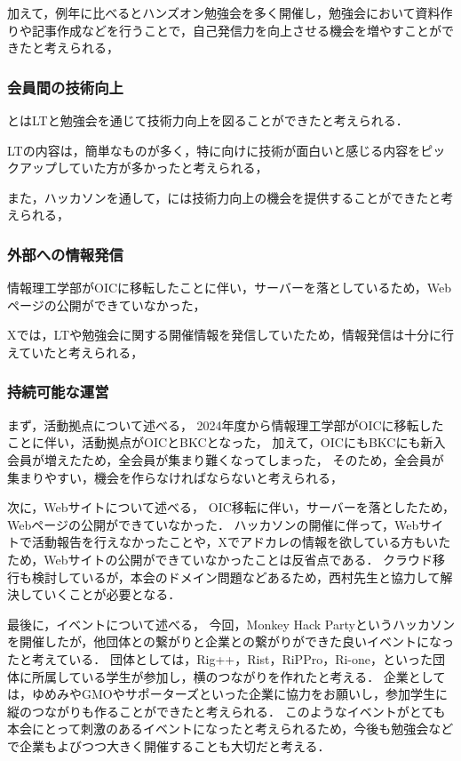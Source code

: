 加えて，例年に比べるとハンズオン勉強会を多く開催し，勉強会において資料作りや記事作成などを行うことで，自己発信力を向上させる機会を増やすことができたと考えられる，

\subsubsection*{会員間の技術向上}
\secondGrade{}と\thirdGrade{}はLTと勉強会を通じて技術力向上を図ることができたと考えられる．

LTの内容は，簡単なものが多く，特に\firstGrade{}向けに技術が面白いと感じる内容をピックアップしていた方が多かったと考えられる，

また，ハッカソンを通して，\firstGrade{}には技術力向上の機会を提供することができたと考えられる，

\subsubsection*{外部への情報発信}
情報理工学部がOICに移転したことに伴い，サーバーを落としているため，Webページの公開ができていなかった，

Xでは，LTや勉強会に関する開催情報を発信していたため，情報発信は十分に行えていたと考えられる，

\subsubsection*{持続可能な運営}

まず，活動拠点について述べる，
2024年度から情報理工学部がOICに移転したことに伴い，活動拠点がOICとBKCとなった，
加えて，OICにもBKCにも新入会員が増えたため，全会員が集まり難くなってしまった，
そのため，全会員が集まりやすい，機会を作らなければならないと考えられる，

次に，Webサイトについて述べる，
OIC移転に伴い，サーバーを落としたため，Webページの公開ができていなかった．
ハッカソンの開催に伴って，Webサイトで活動報告を行えなかったことや，Xでアドカレの情報を欲している方もいたため，Webサイトの公開ができていなかったことは反省点である．
クラウド移行も検討しているが，本会のドメイン問題などあるため，西村先生と協力して解決していくことが必要となる．

最後に，イベントについて述べる，
今回，Monkey Hack Partyというハッカソンを開催したが，他団体との繋がりと企業との繋がりができた良いイベントになったと考えている．
団体としては，Rig++，Rist，RiPPro，Ri-one，といった団体に所属している学生が参加し，横のつながりを作れたと考える．
企業としては，ゆめみやGMOやサポーターズといった企業に協力をお願いし，参加学生に縦のつながりも作ることができたと考えられる．
このようなイベントがとても本会にとって刺激のあるイベントになったと考えられるため，今後も勉強会などで企業もよびつつ大きく開催することも大切だと考える．


